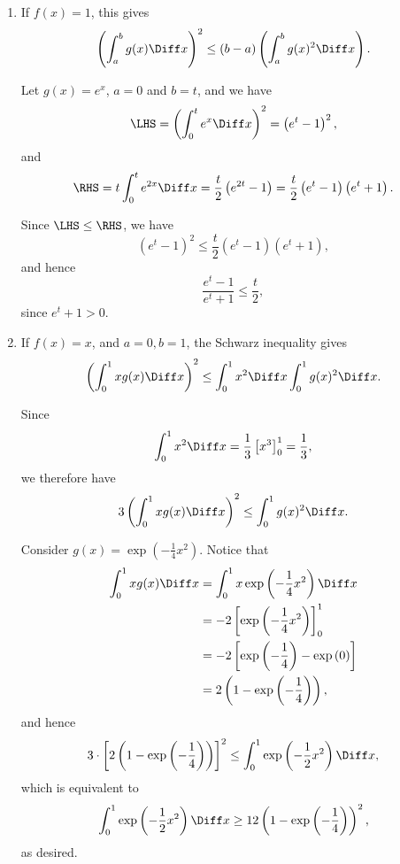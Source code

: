 \Question{\currfilebase}

\begin{enumerate}
    \item If \(f(x) = 1\), this gives
          \[
              \left(\int_{a}^{b} g(x) \Diff x\right)^2 \leq (b - a) \left(\int_{a}^{b} g(x)^2 \Diff x\right).
          \]

          Let \(g(x) = e^x\), \(a = 0\) and \(b = t\), and we have
          \[
              \LHS = \left(\int_{0}^{t} e^x \Diff x\right)^2 = \left(e^t - 1\right)^2,
          \]
          and
          \[
              \RHS = t \int_{0}^{t} e^{2x} \Diff x = \frac{t}{2} \left(e^{2t} - 1\right) = \frac{t}{2} \left(e^t - 1\right) \left(e^t + 1\right).
          \]

          Since \(\LHS \leq \RHS\), we have
          \[
              \left(e^t - 1\right)^2 \leq \frac{t}{2} \left(e^t - 1\right) \left(e^t + 1\right),
          \]
          and hence
          \[
              \frac{e^t - 1}{e^t + 1} \leq \frac{t}{2},
          \]
          since \(e^t + 1 > 0\).

    \item If \(f(x) = x\), and \(a = 0, b = 1\), the Schwarz inequality gives
          \[
              \left(\int_{0}^{1} x g(x) \Diff x\right)^2 \leq \int_{0}^{1} x^2 \Diff x \int_{0}^{1} g(x)^2 \Diff x.
          \]

          Since
          \[
              \int_{0}^{1} x^2 \Diff x = \frac{1}{3} \left[x^3\right]_{0}^{1} = \frac{1}{3},
          \]
          we therefore have
          \[
              3\left(\int_{0}^{1} x g(x) \Diff x\right)^2 \leq \int_{0}^{1} g(x)^2 \Diff x.
          \]

          Consider \(g(x) = \exp\left(-\frac{1}{4} x^2\right)\). Notice that
          \begin{align*}
              \int_{0}^{1} x g(x) \Diff x & = \int_{0}^{1} x \exp\left(-\frac{1}{4} x^2\right) \Diff x            \\
                                          & = -2 \left[\exp\left(-\frac{1}{4} x^2\right)\right]_{0}^{1}           \\
                                          & = -2 \left[\exp\left(-\frac{1}{4}\right) - \exp \left(0\right)\right] \\
                                          & = 2 \left(1 - \exp\left(-\frac{1}{4}\right)\right),
          \end{align*}
          and hence
          \[
              3 \cdot \left[2 \left(1 - \exp\left(-\frac{1}{4}\right)\right)\right]^2 \leq \int_{0}^{1} \exp\left(-\frac{1}{2} x^2\right) \Diff x,
          \]
          which is equivalent to
          \[
              \int_{0}^{1} \exp\left(-\frac{1}{2} x^2\right) \Diff x \geq 12 \left(1 - \exp\left(-\frac{1}{4}\right)\right)^2,
          \]
          as desired.


\end{enumerate}
